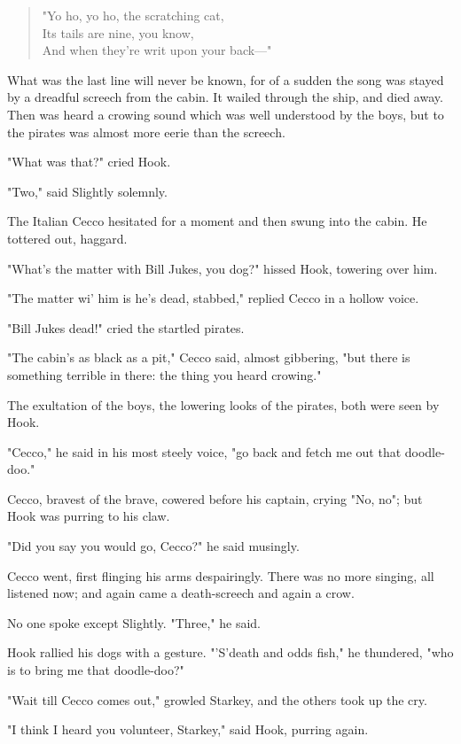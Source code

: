 \begin{verse}
	"Yo ho, yo ho, the scratching cat,\\
	Its tails are nine, you know,\\
	And when they're writ upon your back—"
\end{verse}

What was the last line will never be known, for of a sudden the song was stayed by a dreadful screech from the cabin.
It wailed through the ship, and died away.
Then was heard a crowing sound which was well understood by the boys, but to the pirates was almost more eerie than the screech.

"What was that?\@" cried Hook.

"Two," said Slightly solemnly.

The Italian Cecco hesitated for a moment and then swung into the cabin.
He tottered out, haggard.

"What's the matter with Bill Jukes, you dog?\@" hissed Hook, towering over him.

"The matter wi' him is he's dead, stabbed," replied Cecco in a hollow voice.

"Bill Jukes dead!\@" cried the startled pirates.

"The cabin's as black as a pit," Cecco said, almost gibbering, "but there is something terrible in there:
the thing you heard crowing."

The exultation of the boys, the lowering looks of the pirates, both were seen by Hook.

"Cecco," he said in his most steely voice, "go back and fetch me out that doodle-doo."

Cecco, bravest of the brave, cowered before his captain, crying "No, no";
but Hook was purring to his claw.

"Did you say you would go, Cecco?\@" he said musingly.

Cecco went, first flinging his arms despairingly.
There was no more singing, all listened now;
and again came a death-screech and again a crow.

No one spoke except Slightly.
"Three," he said.

Hook rallied his dogs with a gesture.
"'S'death and odds fish," he thundered, "who is to bring me that doodle-doo?"

"Wait till Cecco comes out," growled Starkey, and the others took up the cry.

"I think I heard you volunteer, Starkey," said Hook, purring again.

